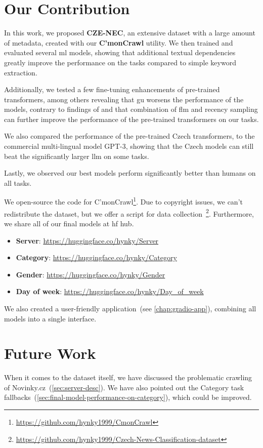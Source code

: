 \section{Our Contribution}
In this work, we proposed \textbf{CZE-NEC}, an extensive dataset with a large amount of metadata,
created with our \textbf{C'monCrawl} utility. We then trained and evaluated
several \ac{ml} models, showing that additional textual dependencies greatly
improve the performance on the tasks compared to simple keyword extraction.

Additionally, we tested a few fine-tuning enhancements of pre-trained transformers,
among others revealing that \ac{gu} worsens the performance of the models, contrary to findings of 
\textcite{howardUniversalLanguageModel2018a} and that combination of \ac{flm} and
recency sampling can further improve the performance of the pre-trained transformers
on our tasks.

We also compared the performance of the pre-trained Czech transformers, to the commercial
multi-lingual model GPT-3, showing that the Czech models can still beat the significantly
larger \ac{llm} on some tasks.

Lastly, we observed our best models perform significantly better than humans on all tasks.

We open-source the code for C'monCrawl\footnote{\url{https://github.com/hynky1999/CmonCrawl}}.
Due to copyright issues, we can't redistribute the dataset, but we offer a script for data collection~\footnote{\url{https://github.com/hynky1999/Czech-News-Classification-dataset}}.
Furthermore, we share all of our final models at \ac{hf} hub.
\begin{itemize}
    \item \textbf{Server}: \url{https://huggingface.co/hynky/Server}
    \item \textbf{Category}: \url{https://huggingface.co/hynky/Category}
    \item \textbf{Gender}: \url{https://huggingface.co/hynky/Gender}
    \item \textbf{Day of week}: \url{https://huggingface.co/hynky/Day_of_week}
\end{itemize}
We also created a user-friendly application~(see \autoref{chap:gradio-app}),
combining all models into a single interface.

\section{Future Work}
When it comes to the dataset itself, we have discussed the problematic crawling of 
Novinky.cz~(\autoref{sec:server-desc}). We have also
pointed out the Category task fallbacks~(\autoref{sec:final-model-performance-on-category}),
which could be improved.

